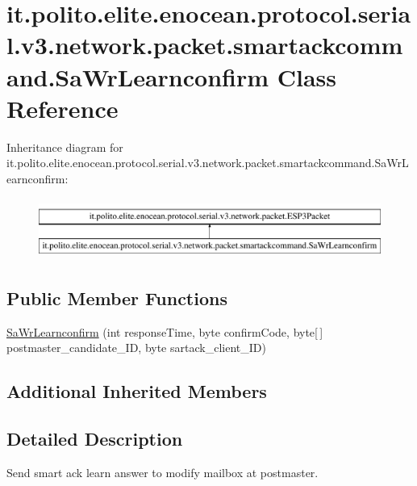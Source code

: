\hypertarget{classit_1_1polito_1_1elite_1_1enocean_1_1protocol_1_1serial_1_1v3_1_1network_1_1packet_1_1smartac884373f7fe0ef21e322bf9928edc3fa}{}\section{it.\+polito.\+elite.\+enocean.\+protocol.\+serial.\+v3.\+network.\+packet.\+smartackcommand.\+Sa\+Wr\+Learnconfirm Class Reference}
\label{classit_1_1polito_1_1elite_1_1enocean_1_1protocol_1_1serial_1_1v3_1_1network_1_1packet_1_1smartac884373f7fe0ef21e322bf9928edc3fa}
Inheritance diagram for it.\+polito.\+elite.\+enocean.\+protocol.\+serial.\+v3.\+network.\+packet.\+smartackcommand.\+Sa\+Wr\+Learnconfirm\+:\begin{figure}[H]
\begin{center}
\leavevmode
\includegraphics[height=2.000000cm]{classit_1_1polito_1_1elite_1_1enocean_1_1protocol_1_1serial_1_1v3_1_1network_1_1packet_1_1smartac884373f7fe0ef21e322bf9928edc3fa}
\end{center}
\end{figure}
\subsection*{Public Member Functions}
\begin{DoxyCompactItemize}
\item 
\hyperlink{classit_1_1polito_1_1elite_1_1enocean_1_1protocol_1_1serial_1_1v3_1_1network_1_1packet_1_1smartac884373f7fe0ef21e322bf9928edc3fa_ad48c1e1ec826a4135f462a769362b155}{Sa\+Wr\+Learnconfirm} (int response\+Time, byte confirm\+Code, byte\mbox{[}$\,$\mbox{]} postmaster\+\_\+candidate\+\_\+\+ID, byte sartack\+\_\+client\+\_\+\+ID)
\end{DoxyCompactItemize}
\subsection*{Additional Inherited Members}


\subsection{Detailed Description}
Send smart ack learn answer to modify mailbox at postmaster.

